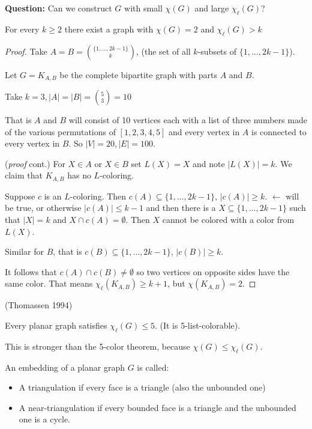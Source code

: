 \textbf{Question:} Can we construct $G$ with small $\chi(G)$ and large $\chi_{\ell}(G)$?

\begin{proposition}
For every $k\geq 2$ there exist a graph with $\chi(G)=2$ and $\chi_{\ell}(G)>k$
\end{proposition}

\begin{proof}
Take $A=B=\binom{\{1,\ldots,2k-1\}}{k}$, (the set of all $k$-subsets of $\{1,\ldots,2k-1\}$).

Let $G=K_{A,B}$ be the complete bipartite graph with parts $A$ and $B$.
\begin{example}
Take $k=3, |A|=|B|=\binom{5}{3}=10$

That is $A$ and $B$ will consist of 10 vertices each with a list of three numbers made of the various permutations of $[1,2,3,4,5]$ and every vertex in $A$ is connected to every vertex in $B$. So $|V|=20, |E|=100$.
\end{example}

(\textit{proof} cont.)
For $X \in A$ or $X \in B$ set $L(X)=X$ and note $|L(X)|=k.$
We claim that $K_{A,B}$ has no $L$-coloring.

Suppose $c$ is an $L$-coloring. Then $c(A)\subseteq \{1,\ldots,2k-1\}$, $|c(A)|\geq k$. $\leftarrow$ will be true, or otherwise $|c(A)|\leq k-1$ and then there is a $X\subseteq\{1,\ldots,2k-1\}$ such that $|X|=k$ and $X\cap c(A)=\emptyset$. Then $X$ cannot be colored with a color from $L(X)$.

Similar for $B$, that is  $c(B)\subseteq \{1,\ldots,2k-1\}$, $|c(B)|\geq k$.

It follows  that $c(A)\cap c(B)\neq \emptyset$ so two vertices on opposite sides have the same color. That means $\chi_{\ell}(K_{A,B})\geq k+1$, but $\chi(K_{A,B})=2$.
\end{proof}

\begin{theorem}
(Thomassen 1994)

Every planar graph satisfies $\chi_{\ell}(G)\leq 5$. (It is 5-list-colorable).  
\end{theorem}
\begin{remark}
This is stronger than the 5-color theorem, because $\chi(G)\leq \chi_{\ell}(G)$.
\end{remark}

\begin{definition}
An embedding of a planar graph $G$ is called:
\begin{itemize}
\item A triangulation if every face is a triangle (also the unbounded one)
\item A near-triangulation if every bounded face is a triangle and the unbounded one is a cycle.
\end{itemize}
\end{definition}


